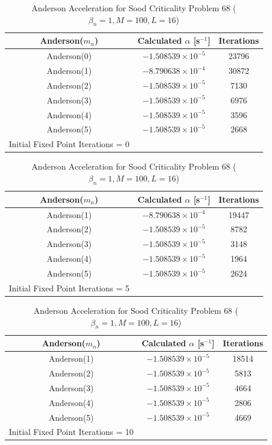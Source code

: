 \begin{table}[!htbp]
\caption{Anderson Acceleration for Sood Criticality Problem 68 ($\beta_{n} = 1, M = 100, L = 16$)}
	\label{table:Sood68AA}
	\begin{subtable}[h]{1.0\textwidth}
	\centering{}
	\begin{tabular}{@{}ccc@{}}\toprule
	Anderson($m_{n}$) & Calculated $\alpha$ [s$^{-1}$] & Iterations \\
	\midrule
	Anderson(0) & $-1.508539 \times 10^{-5}$ & 23796 \\
	Anderson(1) & $-8.790638 \times 10^{-4}$ & 30872 \\
	Anderson(2) & $-1.508539 \times 10^{-5}$ & 7130 \\
	Anderson(3) & $-1.508539 \times 10^{-5}$ & 6976 \\
	Anderson(4) & $-1.508539 \times 10^{-5}$ & 3596 \\
	Anderson(5) & $-1.508539 \times 10^{-5}$ & 2668 \\
	\bottomrule
	Initial Fixed Point Iterations = 0
	\end{tabular}
	\end{subtable}%
	\vspace{0.25cm}
	\begin{subtable}[h]{1.0\textwidth}
	\centering{}
	\begin{tabular}{@{}ccc@{}}\toprule
	Anderson($m_{n}$) & Calculated $\alpha$ [s$^{-1}$] & Iterations \\
	\midrule
	Anderson(1) & $-8.790638 \times 10^{-4}$ & 19447 \\
	Anderson(2) & $-1.508539 \times 10^{-5}$ & 8782 \\
	Anderson(3) & $-1.508539 \times 10^{-5}$ & 3148 \\
	Anderson(4) & $-1.508539 \times 10^{-5}$ & 1964 \\
	Anderson(5) & $-1.508539 \times 10^{-5}$ & 2624 \\
	\bottomrule
	Initial Fixed Point Iterations = 5
	\end{tabular}
	\end{subtable}%
	\vspace{0.25cm}
	\begin{subtable}[h]{1.0\textwidth}
	\centering{}
	\begin{tabular}{@{}ccc@{}}\toprule
	Anderson($m_{n}$) & Calculated $\alpha$ [s$^{-1}$] & Iterations \\
	\midrule
	Anderson(1) & $-1.508539 \times 10^{-5}$ & 18514 \\
	Anderson(2) & $-1.508539 \times 10^{-5}$ & 5813 \\
	Anderson(3) & $-1.508539 \times 10^{-5}$ & 4664 \\
	Anderson(4) & $-1.508539 \times 10^{-5}$ & 2806 \\
	Anderson(5) & $-1.508539 \times 10^{-5}$ & 4669 \\
	\bottomrule
	Initial Fixed Point Iterations = 10
	\end{tabular}
	\end{subtable}
\end{table}

